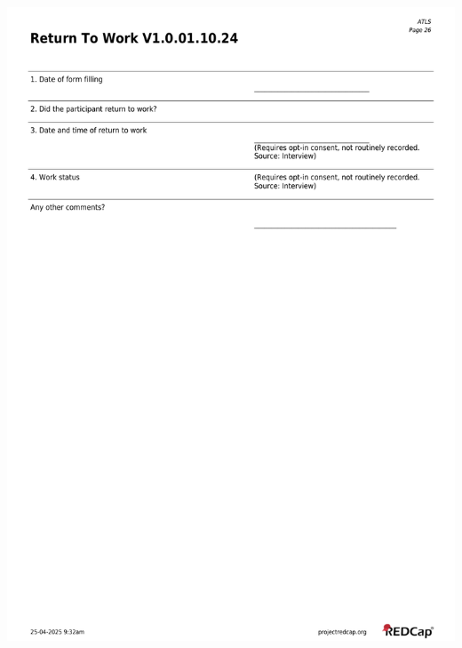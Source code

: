 \documentclass[
]{scrartcl}
\begin{document}
\includegraphics{../case-record-form/instrument-pdfs/pages/all-instruments-26.pdf}
\end{document}
